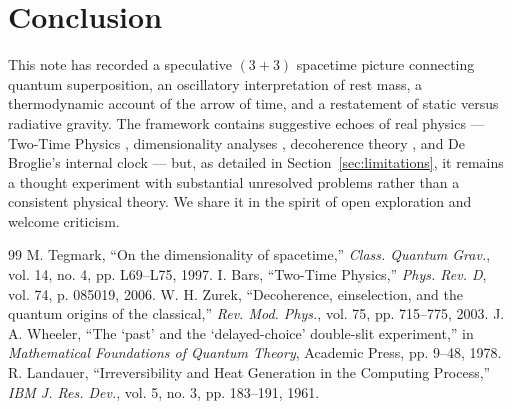 \documentclass[11pt,a4paper]{article}
\begin{document}
\section{Conclusion}

This note has recorded a speculative $(3+3)$ spacetime picture connecting quantum superposition, an oscillatory interpretation of rest mass, a thermodynamic account of the arrow of time, and a restatement of static versus radiative gravity. The framework contains suggestive echoes of real physics --- Two-Time Physics \cite{Bars2006}, dimensionality analyses \cite{Tegmark1997}, decoherence theory \cite{Zurek2003}, and De Broglie's internal clock --- but, as detailed in Section~\ref{sec:limitations}, it remains a thought experiment with substantial unresolved problems rather than a consistent physical theory. We share it in the spirit of open exploration and welcome criticism.

\begin{thebibliography}{99}
 M. Tegmark, ``On the dimensionality of spacetime,'' \textit{Class. Quantum Grav.}, vol. 14, no. 4, pp. L69--L75, 1997.
 I. Bars, ``Two-Time Physics,'' \textit{Phys. Rev. D}, vol. 74, p. 085019, 2006.
 W. H. Zurek, ``Decoherence, einselection, and the quantum origins of the classical,'' \textit{Rev. Mod. Phys.}, vol. 75, pp. 715--775, 2003.
 J. A. Wheeler, ``The `past' and the `delayed-choice' double-slit experiment,'' in \textit{Mathematical Foundations of Quantum Theory}, Academic Press, pp. 9--48, 1978.
 R. Landauer, ``Irreversibility and Heat Generation in the Computing Process,'' \textit{IBM J. Res. Dev.}, vol. 5, no. 3, pp. 183--191, 1961.
\end{thebibliography}
\end{document}
